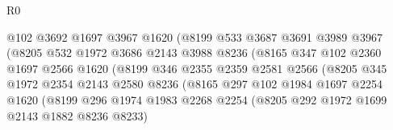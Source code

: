 \begin{lexlean}{R0}
\begin{coremodule}
                                      @102
                                      @3692
                                      @1697
                                      @3967
                                      @1620
                                      (@8199
                                        @533
                                        @3687
                                        @3691
                                        @3989
                                        @3967
                                        (@8205
                                          @532
                                          @1972
                                          @3686
                                          @2143
                                          @3988
                                          @8236
                                          (@8165
                                            @347
                                            @102
                                            @2360
                                            @1697
                                            @2566
                                            @1620
                                            (@8199
                                              @346
                                              @2355
                                              @2359
                                              @2581
                                              @2566
                                              (@8205
                                                @345
                                                @1972
                                                @2354
                                                @2143
                                                @2580
                                                @8236
                                                (@8165
                                                  @297
                                                  @102
                                                  @1984
                                                  @1697
                                                  @2254
                                                  @1620
                                                  (@8199
                                                    @296
                                                    @1974
                                                    @1983
                                                    @2268
                                                    @2254
                                                    (@8205 @292 @1972 @1699 @2143 @1882 @8236 @8233)

\end{coremodule}
\end{lexlean}
